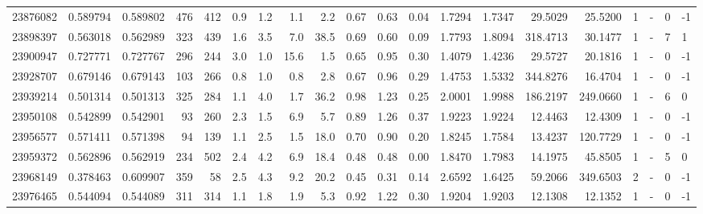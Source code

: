 \begin{tabular}{rrrrrrrrrrrrrrrrrlrl}
  23876082 & 0.589794 &   0.589802 &  476 &  412 &      0.9 &      1.2 &     1.1 &      2.2 &       0.67 &        0.63 &        0.04 &  1.7294 &  1.7347 &   29.5029 &   25.5200 &       1 &             - &        0 &        -1 \\
  23898397 & 0.563018 &   0.562989 &  323 &  439 &      1.6 &      3.5 &     7.0 &     38.5 &       0.69 &        0.60 &        0.09 &  1.7793 &  1.8094 &  318.4713 &   30.1477 &       1 &             - &        7 &         1 \\
  23900947 & 0.727771 &   0.727767 &  296 &  244 &      3.0 &      1.0 &    15.6 &      1.5 &       0.65 &        0.95 &        0.30 &  1.4079 &  1.4236 &   29.5727 &   20.1816 &       1 &             - &        0 &        -1 \\
  23928707 & 0.679146 &   0.679143 &  103 &  266 &      0.8 &      1.0 &     0.8 &      2.8 &       0.67 &        0.96 &        0.29 &  1.4753 &  1.5332 &  344.8276 &   16.4704 &       1 &             - &        0 &        -1 \\
  23939214 & 0.501314 &   0.501313 &  325 &  284 &      1.1 &      4.0 &     1.7 &     36.2 &       0.98 &        1.23 &        0.25 &  2.0001 &  1.9988 &  186.2197 &  249.0660 &       1 &             - &        6 &         0 \\
  23950108 & 0.542899 &   0.542901 &   93 &  260 &      2.3 &      1.5 &     6.9 &      5.7 &       0.89 &        1.26 &        0.37 &  1.9223 &  1.9224 &   12.4463 &   12.4309 &       1 &             - &        0 &        -1 \\
  23956577 & 0.571411 &   0.571398 &   94 &  139 &      1.1 &      2.5 &     1.5 &     18.0 &       0.70 &        0.90 &        0.20 &  1.8245 &  1.7584 &   13.4237 &  120.7729 &       1 &             - &        0 &        -1 \\
  23959372 & 0.562896 &   0.562919 &  234 &  502 &      2.4 &      4.2 &     6.9 &     18.4 &       0.48 &        0.48 &        0.00 &  1.8470 &  1.7983 &   14.1975 &   45.8505 &       1 &             - &        5 &         0 \\
  23968149 & 0.378463 &   0.609907 &  359 &   58 &      2.5 &      4.3 &     9.2 &     20.2 &       0.45 &        0.31 &        0.14 &  2.6592 &  1.6425 &   59.2066 &  349.6503 &       2 &             - &        0 &        -1 \\
  23976465 & 0.544094 &   0.544089 &  311 &  314 &      1.1 &      1.8 &     1.9 &      5.3 &       0.92 &        1.22 &        0.30 &  1.9204 &  1.9203 &   12.1308 &   12.1352 &       1 &             - &        0 &        -1 \\

\end{tabular}
